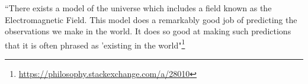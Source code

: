     \begin{tcolorbox}[
        colbacktitle=red!10!white,
        colback=blue!10!white,coltitle=red!70!black,
        title=Does the Electromagnetic Field \textit{physically} exist?
    ]
        ``There exists a model of the universe which includes a field known as the Electromagnetic Field. This
        model does a remarkably good job of predicting the observations we make in the world. It does so good at
        making such predictions that it is often phrased as 'existing in the
        world"\footnote{\href{https://philosophy.stackexchange.com/a/28010}{https://philosophy.stackexchange.com/a/28010}}
    \end{tcolorbox}

    

    \printbibliography

